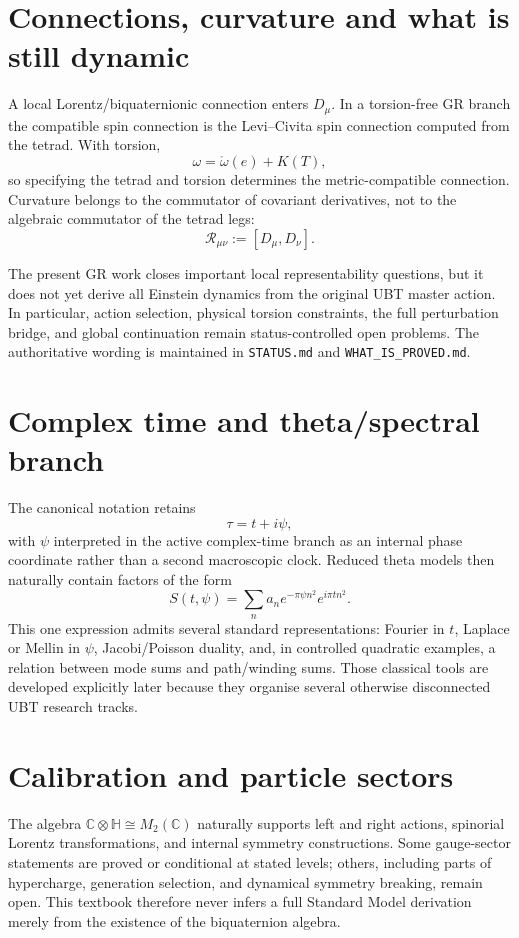 \section{Connections, curvature and what is still dynamic}
A local Lorentz/biquaternionic connection enters $D_\mu$.  In a torsion-free GR
branch the compatible spin connection is the Levi--Civita spin connection
computed from the tetrad.  With torsion,
\[
 \omega=\mathring\omega(e)+K(T),
\]
so specifying the tetrad and torsion determines the metric-compatible
connection.  Curvature belongs to the commutator of covariant derivatives,
not to the algebraic commutator of the tetrad legs:
\[
 \mathcal R_{\mu\nu}:=[D_\mu,D_\nu].
\]

The present GR work closes important local representability questions, but it
does not yet derive all Einstein dynamics from the original UBT master action.
In particular, action selection, physical torsion constraints, the full
perturbation bridge, and global continuation remain status-controlled open
problems.  The authoritative wording is maintained in
\texttt{STATUS.md} and \texttt{WHAT\_IS\_PROVED.md}.

\section{Complex time and theta/spectral branch}
The canonical notation retains
\[
 \tau=t+i\psi,
\]
with $\psi$ interpreted in the active complex-time branch as an internal phase
coordinate rather than a second macroscopic clock.  Reduced theta models then
naturally contain factors of the form
\[
 S(t,\psi)=\sum_n a_n e^{-\pi\psi n^2}e^{i\pi t n^2}.
\]
This one expression admits several standard representations: Fourier in $t$,
Laplace or Mellin in $\psi$, Jacobi/Poisson duality, and, in controlled
quadratic examples, a relation between mode sums and path/winding sums.  Those
classical tools are developed explicitly later because they organise several
otherwise disconnected UBT research tracks.

\section{Calibration and particle sectors}
The algebra $\mathbb C\otimes\mathbb H\cong M_2(\mathbb C)$ naturally supports
left and right actions, spinorial Lorentz transformations, and internal
symmetry constructions.  Some gauge-sector statements are proved or
conditional at stated levels; others, including parts of hypercharge,
generation selection, and dynamical symmetry breaking, remain open.  This
textbook therefore never infers a full Standard Model derivation merely from
the existence of the biquaternion algebra.

